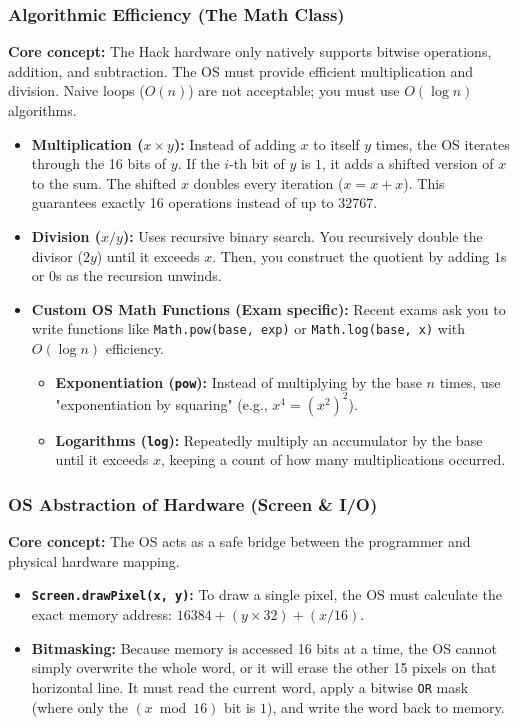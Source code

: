 \documentclass[12pt,a4paper]{article}
\begin{document}
\subsubsection*{Algorithmic Efficiency (The Math Class)}
\textbf{Core concept:} The Hack hardware only natively supports bitwise operations, addition, and subtraction. The OS must provide efficient multiplication and division. Naive loops ($O(n)$) are not acceptable; you must use $O(\log n)$ algorithms.
\begin{itemize}
    \item \textbf{Multiplication ($x \times y$):} Instead of adding $x$ to itself $y$ times, the OS iterates through the 16 bits of $y$. If the $i$-th bit of $y$ is $1$, it adds a shifted version of $x$ to the sum. The shifted $x$ doubles every iteration ($x = x + x$). This guarantees exactly 16 operations instead of up to $32767$.
    \item \textbf{Division ($x / y$):} Uses recursive binary search. You recursively double the divisor ($2y$) until it exceeds $x$. Then, you construct the quotient by adding $1$s or $0$s as the recursion unwinds.
    \item \textbf{Custom OS Math Functions (Exam specific):} Recent exams ask you to write functions like \texttt{Math.pow(base, exp)} or \texttt{Math.log(base, x)} with $O(\log n)$ efficiency.
    \begin{itemize}
        \item \textbf{Exponentiation (\texttt{pow}):} Instead of multiplying by the base $n$ times, use "exponentiation by squaring" (e.g., $x^4 = (x^2)^2$). 
        \item \textbf{Logarithms (\texttt{log}):} Repeatedly multiply an accumulator by the base until it exceeds $x$, keeping a count of how many multiplications occurred.
    \end{itemize}
\end{itemize}

\subsubsection*{OS Abstraction of Hardware (Screen \& I/O)}
\textbf{Core concept:} The OS acts as a safe bridge between the programmer and physical hardware mapping.
\begin{itemize}
    \item \textbf{\texttt{Screen.drawPixel(x, y)}:} To draw a single pixel, the OS must calculate the exact memory address: $16384 + (y \times 32) + (x / 16)$. 
    \item \textbf{Bitmasking:} Because memory is accessed 16 bits at a time, the OS cannot simply overwrite the whole word, or it will erase the other 15 pixels on that horizontal line. It must read the current word, apply a bitwise \texttt{OR} mask (where only the $(x \bmod 16)$ bit is $1$), and write the word back to memory.
\end{itemize}
\end{document}
